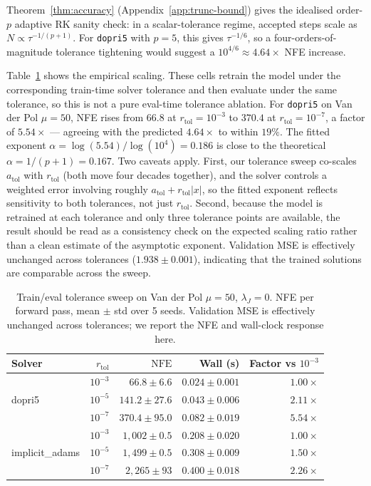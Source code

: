 \documentclass[11pt]{article}
\theoremstyle{plain}
\theoremstyle{definition}
\newcommand{\NFE}{\mathrm{NFE}}
\begin{document}
Theorem~\ref{thm:accuracy} (Appendix~\ref{app:trunc-bound}) gives the idealised
order-$p$ adaptive RK sanity check: in a scalar-tolerance regime, accepted
steps scale as $N \propto \tau^{-1/(p+1)}$. For \texttt{dopri5} with $p = 5$,
this gives $\tau^{-1/6}$, so a four-orders-of-magnitude tolerance tightening
would suggest a $10^{4/6} \approx 4.64\times$ NFE increase.

Table~\ref{tab:tol-sweep} shows the empirical scaling. These cells retrain the
model under the corresponding train-time solver tolerance and then evaluate
under the same tolerance, so this is not a pure eval-time tolerance ablation.
For \texttt{dopri5} on
Van der Pol $\mu = 50$, NFE rises from $66.8$ at $r_\text{tol} = 10^{-3}$ to
$370.4$ at $r_\text{tol} = 10^{-7}$, a factor of $5.54\times$ --- agreeing
with the predicted $4.64\times$ to within $19\%$. The fitted exponent
$\alpha = \log(5.54)/\log(10^4) = 0.186$ is close to the theoretical
$\alpha = 1/(p+1) = 0.167$. Two caveats apply. First, our tolerance sweep
co-scales $a_\text{tol}$ with $r_\text{tol}$ (both move four decades
together), and the solver controls a weighted error involving roughly
$a_\text{tol}+r_\text{tol}|x|$, so the fitted exponent reflects sensitivity to
both tolerances, not just $r_\text{tol}$. Second, because the model is retrained at each
tolerance and only three tolerance points are available, the result should be
read as a consistency check on the expected scaling ratio rather than a clean
estimate of the asymptotic exponent. Validation MSE is effectively unchanged
across tolerances ($1.938 \pm 0.001$), indicating that the trained solutions
are comparable across the sweep.

\begin{table}[t]
\centering
\caption{Train/eval tolerance sweep on Van der Pol $\mu = 50$,
  $\lambda_J = 0$. NFE per forward pass, mean $\pm$ std over 5 seeds.
  Validation MSE is effectively unchanged across tolerances; we report the
  NFE and wall-clock response here.}
\label{tab:tol-sweep}
\begin{tabular}{l r r r r}
\toprule
Solver & $r_\text{tol}$ & $\NFE$ & Wall (s) & Factor vs $10^{-3}$ \\
\midrule
\multirow{3}{*}{dopri5}          & $10^{-3}$ & $66.8 \pm 6.6$    & $0.024 \pm 0.001$ & $1.00\times$ \\
                                 & $10^{-5}$ & $141.2 \pm 27.6$  & $0.043 \pm 0.006$ & $2.11\times$ \\
                                 & $10^{-7}$ & $370.4 \pm 95.0$  & $0.082 \pm 0.019$ & $\mathbf{5.54\times}$ \\
\midrule
\multirow{3}{*}{implicit\_adams} & $10^{-3}$ & $1{,}002 \pm 0.5$  & $0.208 \pm 0.020$ & $1.00\times$ \\
                                 & $10^{-5}$ & $1{,}499 \pm 0.5$  & $0.308 \pm 0.009$ & $1.50\times$ \\
                                 & $10^{-7}$ & $2{,}265 \pm 93$   & $0.400 \pm 0.018$ & $2.26\times$ \\
\bottomrule
\end{tabular}
\end{table}
\end{document}
